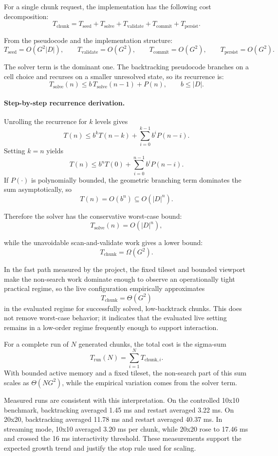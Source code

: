 \documentclass[12pt,a4paper]{report}
\begin{document}
For a single chunk request, the implementation has the following cost decomposition:
\[
T_{\text{chunk}} = T_{\text{seed}} + T_{\text{solve}} + T_{\text{validate}} + T_{\text{commit}} + T_{\text{persist}}.
\]

From the pseudocode and the implementation structure:
\[
T_{\text{seed}} = O(G^2 |D|), \qquad T_{\text{validate}} = O(G^2), \qquad T_{\text{commit}} = O(G^2), \qquad T_{\text{persist}} = O(G^2).
\]

The solver term is the dominant one. The backtracking pseudocode branches on a cell choice and recurses on a smaller unresolved state, so its recurrence is:
\[
T_{\text{solve}}(n) \le b\,T_{\text{solve}}(n-1) + P(n), \qquad b \le |D|.
\]

\paragraph{Step-by-step recurrence derivation.}
Unrolling the recurrence for $k$ levels gives
\[
T(n) \le b^k T(n-k) + \sum_{i=0}^{k-1} b^i P(n-i).
\]
Setting $k=n$ yields
\[
T(n) \le b^n T(0) + \sum_{i=0}^{n-1} b^i P(n-i).
\]
If $P(\cdot)$ is polynomially bounded, the geometric branching term dominates the sum asymptotically, so
\[
T(n) = O(b^n) \subseteq O(|D|^n).
\]

Therefore the solver has the conservative worst-case bound:
\[
T_{\text{solve}}(n) = O(|D|^n),
\]

while the unavoidable scan-and-validate work gives a lower bound:
\[
T_{\text{chunk}} = \Omega(G^2).
\]

In the fast path measured by the project, the fixed tileset and bounded viewport make the non-search work dominate enough to observe an operationally tight practical regime, so the live configuration empirically approximates
\[
T_{\text{chunk}} = \Theta(G^2)
\]
in the evaluated regime for successfully solved, low-backtrack chunks. This does not remove worst-case behavior; it indicates that the evaluated live setting remains in a low-order regime frequently enough to support interaction.

For a complete run of $N$ generated chunks, the total cost is the sigma-sum
\[
T_{\text{run}}(N) = \sum_{i=1}^{N} T_{\text{chunk},i}.
\]
With bounded active memory and a fixed tileset, the non-search part of this sum scales as $\Theta(NG^2)$, while the empirical variation comes from the solver term.

Measured runs are consistent with this interpretation. On the controlled 10x10 benchmark, backtracking averaged 1.45 ms and restart averaged 3.22 ms. On 20x20, backtracking averaged 11.78 ms and restart averaged 40.37 ms. In streaming mode, 10x10 averaged 3.20 ms per chunk, while 20x20 rose to 17.46 ms and crossed the 16 ms interactivity threshold. These measurements support the expected growth trend and justify the stop rule used for scaling.
\end{document}

